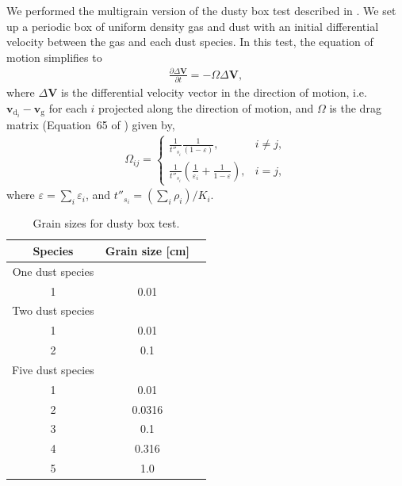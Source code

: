 \documentclass[fleqn,usenatbib]{mnras}
\newcommand{\g}{\mathrm{g}}
\newcommand{\dd}{\mathrm{d}}
\let\vec\bm
\begin{document}
We performed the multigrain version of the dusty box test described in
\citet{Laibe2011MNRAS.418.1491L}. We set up a periodic box of uniform density
gas and dust with an initial differential velocity between the gas and each dust
species. In this test, the equation of motion simplifies to
%
\begin{align}
   \frac{\partial \Delta \vec{V}}{\partial t} = - \Omega \Delta \vec{V},
\end{align}
%
where \(\Delta \vec{V}\) is the differential velocity vector in the direction of
motion, i.e. \(\vec{v}_{\dd_i} - \vec{v}_{\g}\) for each \(i\) projected along
the direction of motion, and \(\Omega\) is the drag matrix (Equation~65 of
\citealt{Laibe2014MNRAS.444.1940L}) given by,
%
\begin{align}
   \Omega_{ij} =
   \begin{cases}
      \frac{1}{t''_{s_i}} \frac{1}{(1 - \varepsilon)}, &i \neq j,\\
      \frac{1}{t''_{s_i}} \left( \frac{1}{\varepsilon_i} +
         \frac{1}{1 - \varepsilon} \right), &i = j,
   \end{cases}
\end{align}
%
where \( \varepsilon = \sum_i \varepsilon_i \), and \( t''_{s_i} = \left( \sum_i
\rho_i \right) / K_i \).

\begin{table}
   \centering
   \begin{tabular}{ccc}
      \hline
      \hline
      Species & Grain size [cm] \\
      \hline
      \hline
      One dust species \\
      1 & 0.01 \\
      \hline
      Two dust species \\
      1 & 0.01 \\
      2 & 0.1 \\
      \hline
      Five dust species \\
      1 & 0.01 \\
      2 & 0.0316 \\
      3 & 0.1 \\
      4 & 0.316 \\
      5 & 1.0 \\
      \hline
      \hline
   \end{tabular}
   \caption{Grain sizes for dusty box test.}%
   \label{tab:box}
\end{table}
\end{document}
